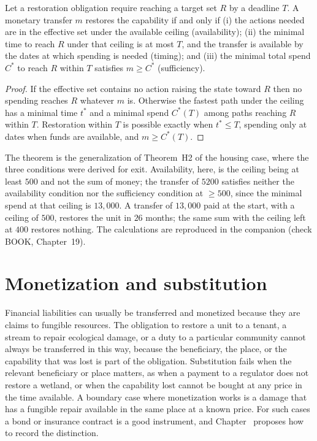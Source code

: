 \begin{theorem}\label{thm:P29b}
Let a restoration obligation require reaching a target set $R$ by a deadline $T$. A monetary transfer $m$ restores the capability if and only if (i) the actions needed are in the effective set under the available ceiling (availability); (ii) the minimal time to reach $R$ under that ceiling is at most $T$, and the transfer is available by the dates at which spending is needed (timing); and (iii) the minimal total spend $C^*$ to reach $R$ within $T$ satisfies $m\ge C^*$ (sufficiency).
\end{theorem}

\begin{proof}
If the effective set contains no action raising the state toward $R$ then no spending reaches $R$ whatever $m$ is. Otherwise the fastest path under the ceiling has a minimal time $t^*$ and a minimal spend $C^*(T)$ among paths reaching $R$ within $T$. Restoration within $T$ is possible exactly when $t^*\le T$, spending only at dates when funds are available, and $m\ge C^*(T)$.
\end{proof}

The theorem is the generalization of Theorem~H2 of the housing case, where the three conditions were derived for exit. Availability, here, is the ceiling being at least $500$ and not the sum of money; the transfer of $5200$ satisfies neither the availability condition nor the sufficiency condition at $\ge 500$, since the minimal spend at that ceiling is $13{,}000$. A transfer of $13{,}000$ paid at the start, with a ceiling of $500$, restores the unit in $26$ months; the same sum with the ceiling left at $400$ restores nothing. The calculations are reproduced in the companion (check BOOK, Chapter~19).

\section{Monetization and substitution}

Financial liabilities can usually be transferred and monetized because they are claims to fungible resources. The obligation to restore a unit to a tenant, a stream to repair ecological damage, or a duty to a particular community cannot always be transferred in this way, because the beneficiary, the place, or the capability that was lost is part of the obligation. Substitution fails when the relevant beneficiary or place matters, as when a payment to a regulator does not restore a wetland, or when the capability lost cannot be bought at any price in the time available. A boundary case where monetization works is a damage that has a fungible repair available in the same place at a known price. For such cases a bond or insurance contract is a good instrument, and Chapter~ proposes how to record the distinction.

